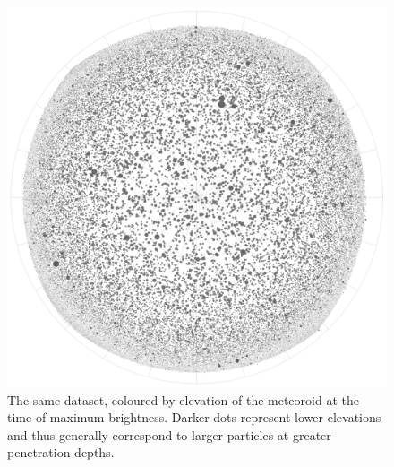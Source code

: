     \begin{figure}
        \includegraphics[width = \linewidth]{pictures/elevation-ago.png}
        \caption{The same dataset, coloured by elevation of the meteoroid at the time of maximum brightness. Darker dots represent lower elevations
            and thus generally correspond to larger particles at greater penetration depths.}
        \label{sim:res:as:ele-ago}
    \end{figure}
